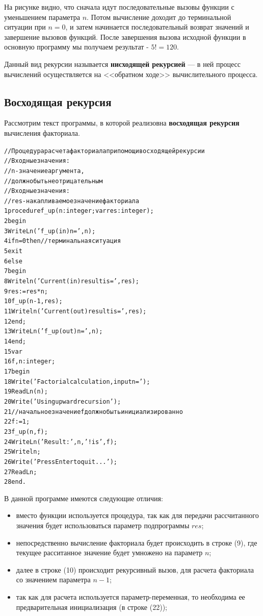 \documentclass[12pt,a4paper]{article}
\begin{document}
На рисунке видно, что сначала идут последовательные вызовы функции с уменьшением параметра $n$. Потом вычисление доходит до терминальной ситуации при $n=0$, и затем начинается последовательный возврат значений и завершение вызовов функций. После завершения вызова исходной функции в основную программу мы получаем результат - $5!=120$.

Данный вид рекурсии называется \textbf{нисходящей рекурсией} --- в ней процесс вычислений осуществляется на <<обратном ходе>> вычислительного процесса.

\subsection{Восходящая рекурсия}

Рассмотрим текст программы, в которой реализовна \textbf{восходящая рекурсия} вычисления факториала.

\begin{alltt}
//Процедура расчета факториала при помощи восходящей рекурсии
//Входные значения:
//  n - значение аргумента,
//      должно быть неотрицательным
//Входные значения:
//  res - накапливаемое значение факториала
1 procedure f\_up(n: integer; var res: integer);
2 begin
3   WriteLn('f\_up (in) n = ', n);
4   if n = 0 then //терминальная ситуация
5     exit
6   else
7     begin
8       Writeln('Current (in) result is = ', res);
9       res := res * n;
10      f\_up(n-1, res);
11      Writeln('Current (out) result is = ', res);
12    end;
13    WriteLn('f\_up (out) n = ', n);
14 end; 
15 var
16   f, n: integer;
17 begin
18   Write('Factorial calculation, input n = ');
19   ReadLn(n);
20   Write('Using upward recursion');
21   //начальное значение f должно быть инициализированно
22   f := 1;
23   f\_up(n, f);
24   WriteLn('Result: ', n, '! is ', f);
25   Writeln;
26   Write('Press Enter to quit...');
27   ReadLn;
28 end.
\end{alltt}

В данной программе имеются следующие отличия:
\begin{itemize} 
	\item вместо функции используется процедура, так как для передачи рассчитанного значения будет использоваться параметр подпрограммы $res$;
	\item непосредственно вычисление факториала будет происходить в строке (9), где текущее расситанное значение будет умножено на параметр $n$;
	\item далее в строке (10) происходит рекурсивный вызов, для расчета факториала со значением параметра $n-1$;
	\item так как для расчета используется параметр-переменная, то необходима ее предварительная инициализация (в строке (22));
\end{itemize}	
\end{document}
